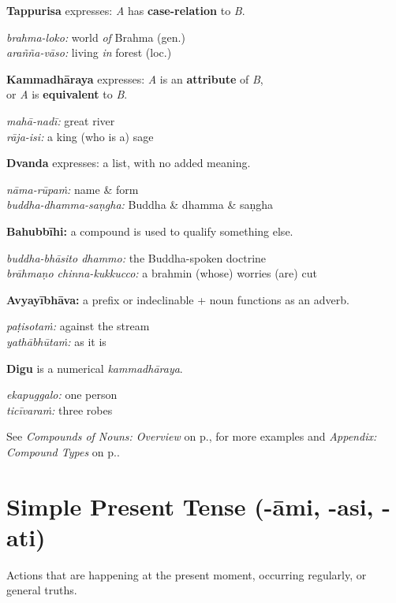 \documentclass[11pt,oneside]{memoir}
\begin{document}
\begin{twocols}


\textbf{Tappurisa} expresses: \emph{A} has \textbf{case-relation} to \emph{B}.

\emph{brahma-loko:} world \emph{of} Brahma (gen.) \\[0pt]
\emph{arañña-vāso:} living \emph{in} forest (loc.)

\textbf{Kammadhāraya} expresses: \emph{A} is an \textbf{attribute} of \emph{B}, \\[0pt]
or \emph{A} is \textbf{equivalent} to \emph{B}.

\emph{mahā-nadī:} great river \\[0pt]
\emph{rāja-isi:}  a king (who is a) sage

\textbf{Dvanda} expresses: a list, with no added meaning.

\emph{nāma-rūpaṁ:} name \& form \\[0pt]
\emph{buddha-dhamma-saṇgha:} Buddha \& dhamma \& saṇgha

\columnbreak

\textbf{Bahubbīhi:} a compound is used to qualify something else.

\emph{buddha-bhāsito dhammo:} the Buddha-spoken doctrine \\[0pt]
\emph{brāhmaṇo chinna-kukkucco:} a brahmin (whose) worries (are) cut

\textbf{Avyayībhāva:} a prefix or indeclinable + noun functions as an adverb.

\emph{paṭisotaṁ:} against the stream \\[0pt]
\emph{yathābhūtaṁ:} as it is

\textbf{Digu} is a numerical \emph{kammadhāraya}.

\emph{ekapuggalo:} one person \\[0pt]
\emph{ticīvaraṁ:} three robes
\end{twocols}

See \emph{Compounds of Nouns: Overview} on p.\pageref{compounds-overview}, for more
examples and \emph{Appendix: Compound Types} on p.\pageref{compound-types}.

\section{Simple Present Tense (-āmi, -asi, -ati)}
\label{sec:org8b10a4d}

Actions that are happening at the present moment, occurring regularly, or general truths.
\end{document}
